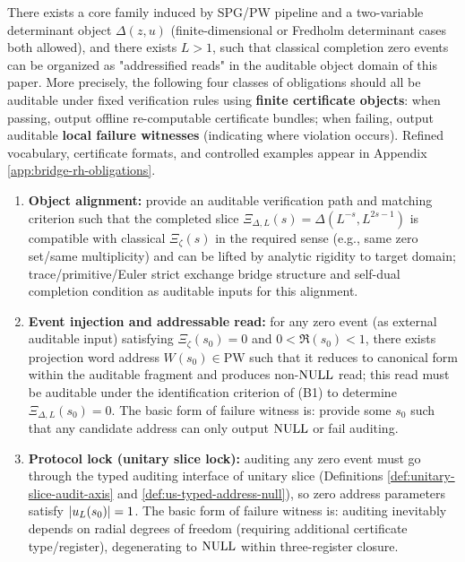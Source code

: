 \begin{assumption}\label{ass:bridge-rh}
There exists a core family induced by SPG/PW pipeline and a two-variable determinant object $\Delta(z,u)$ (finite-dimensional or Fredholm determinant cases both allowed), and there exists $L>1$, such that classical completion zero events can be organized as "addressified reads" in the auditable object domain of this paper. More precisely, the following four classes of obligations should all be auditable under fixed verification rules using \textnormal{\textbf{finite certificate objects}}: when passing, output offline re-computable certificate bundles; when failing, output auditable \textnormal{\textbf{local failure witnesses}} (indicating where violation occurs). Refined vocabulary, certificate formats, and controlled examples appear in Appendix \ref{app:bridge-rh-obligations}.\par
\begin{enumerate}[label=(B\arabic*), ref=B\arabic*]
  \item \label{bridge:b1}
  \textnormal{\textbf{Object alignment:}} provide an auditable verification path and matching criterion such that the completed slice $\Xi_{\Delta,L}(s)=\Delta(L^{-s},L^{2s-1})$ is compatible with classical $\Xi_\zeta(s)$ in the required sense (e.g., same zero set/same multiplicity) and can be lifted by analytic rigidity to target domain; trace/primitive/Euler strict exchange bridge structure and self-dual completion condition as auditable inputs for this alignment.\par

  \item \label{bridge:b2}
  \textnormal{\textbf{Event injection and addressable read:}} for any zero event (as external auditable input) satisfying $\Xi_\zeta(s_0)=0$ and $0<\Re(s_0)<1$, there exists projection word address $W(s_0)\in\mathrm{PW}$ such that it reduces to canonical form within the auditable fragment and produces non-$\mathrm{NULL}$ read; this read must be auditable under the identification criterion of (B1) to determine $\Xi_{\Delta,L}(s_0)=0$. The basic form of failure witness is: provide some $s_0$ such that any candidate address can only output $\mathrm{NULL}$ or fail auditing.\par

  \item \label{bridge:b3}
  \textnormal{\textbf{Protocol lock (unitary slice lock):}} auditing any zero event must go through the typed auditing interface of unitary slice (Definitions \ref{def:unitary-slice-audit-axis} and \ref{def:us-typed-address-null}), so zero address parameters satisfy $\left\lvert u_L(s_0)\right\rvert=1$. The basic form of failure witness is: auditing inevitably depends on radial degrees of freedom (requiring additional certificate type/register), degenerating to $\mathrm{NULL}$ within three-register closure.\par


\end{enumerate}
\end{assumption}
